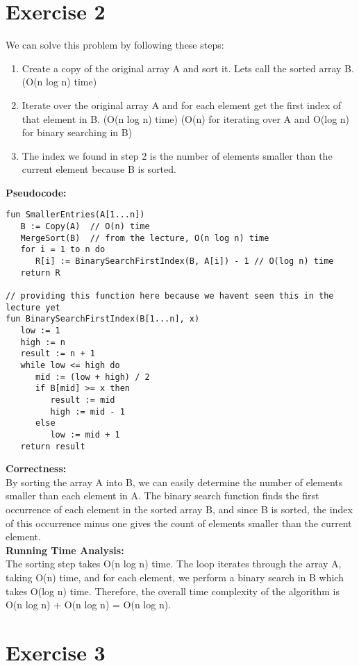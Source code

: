 \documentclass{article}
\begin{document}
\section*{Exercise 2}
We can solve this problem by following these steps:
\begin{enumerate}
   \item Create a copy of the original array A and sort it. Lets call the sorted array B. (O(n log n) time)
   \item Iterate over the original array A and for each element get the first index of that element in B. (O(n log n) time) (O(n) for iterating over A and O(log n) for binary searching in B)
   \item The index we found in step 2 is the number of elements smaller than the current element because B is sorted.
\end{enumerate}
\textbf{Pseudocode:}\\
\begin{verbatim}
fun SmallerEntries(A[1...n])
   B := Copy(A)  // O(n) time
   MergeSort(B)  // from the lecture, O(n log n) time
   for i = 1 to n do
      R[i] := BinarySearchFirstIndex(B, A[i]) - 1 // O(log n) time
   return R

// providing this function here because we havent seen this in the lecture yet
fun BinarySearchFirstIndex(B[1...n], x)
   low := 1
   high := n
   result := n + 1
   while low <= high do
      mid := (low + high) / 2
      if B[mid] >= x then
         result := mid
         high := mid - 1
      else
         low := mid + 1
   return result
\end{verbatim}
\textbf{Correctness:}\\
By sorting the array A into B, we can easily determine the number of elements smaller than each element in A. The binary search function finds the first occurrence of each element in the sorted array B, and since B is sorted, the index of this occurrence minus one gives the count of elements smaller than the current element.\\
\textbf{Running Time Analysis:}\\
The sorting step takes O(n log n) time. The loop iterates through the array A, taking O(n) time, and for each element, we perform a binary search in B which takes O(log n) time. Therefore, the overall time complexity of the algorithm is O(n log n) + O(n log n) = O(n log n).
\section*{Exercise 3}
\end{document}
